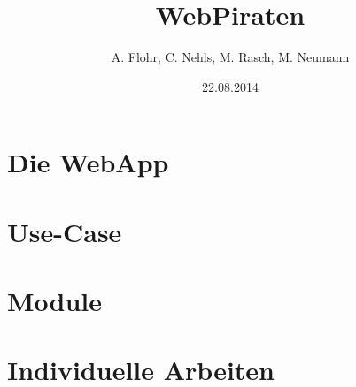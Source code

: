 \documentclass{beamer}
\begin{document}

\title{WebPiraten}  
\author{A. Flohr, C. Nehls, M. Rasch,  M. Neumann}
\date{22.08.2014} 

\begin{frame}
\maketitle
\end{frame} 



\section{Die WebApp}

\section{Use-Case}

\section{Module}






\section{Individuelle Arbeiten}





\end{document}
